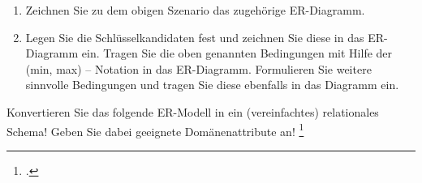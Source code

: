 \documentclass{lehramt-informatik-aufgabe}
\begin{document}
\begin{enumerate}
\item Zeichnen Sie zu dem obigen Szenario das zugehörige ER-Diagramm.

\item Legen Sie die Schlüsselkandidaten fest und zeichnen Sie diese in
das ER-Diagramm ein. Tragen Sie die oben genannten Bedingungen mit Hilfe
der (min, max) – Notation in das ER-Diagramm. Formulieren Sie weitere
sinnvolle Bedingungen und tragen Sie diese ebenfalls in das Diagramm
ein.
\end{enumerate}

Konvertieren Sie das folgende ER-Modell in ein (vereinfachtes)
relationales Schema! Geben Sie dabei geeignete
Domänenattribute an!
\footcite[Aufgabe 5: Fertigungsdatenbank die Zweite (Fortsetzung Staatsexamen Herbst 1997)]{db:ab:7}
\end{document}
